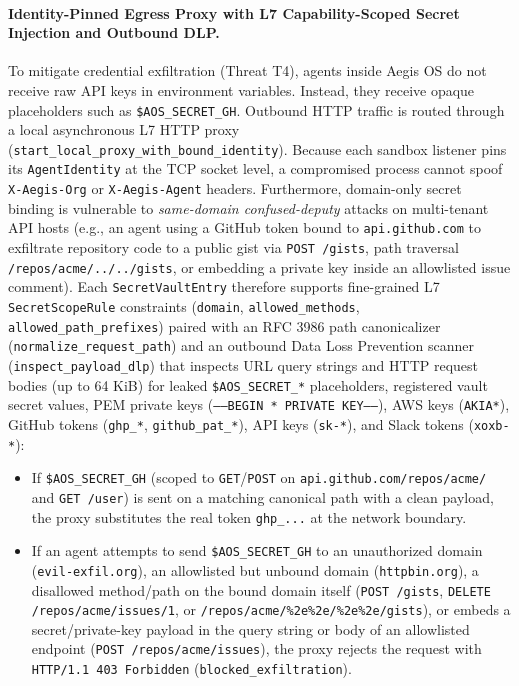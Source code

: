 \documentclass[10pt,twocolumn]{article}
\begin{document}
\paragraph{Identity-Pinned Egress Proxy with L7 Capability-Scoped Secret Injection and Outbound DLP.} To mitigate credential exfiltration (Threat T4), agents inside Aegis OS do not receive raw API keys in environment variables. Instead, they receive opaque placeholders such as \texttt{\$AOS\_SECRET\_GH}. Outbound HTTP traffic is routed through a local asynchronous L7 HTTP proxy (\texttt{start\_local\_proxy\_with\_bound\_identity}). Because each sandbox listener pins its \texttt{AgentIdentity} at the TCP socket level, a compromised process cannot spoof \texttt{X-Aegis-Org} or \texttt{X-Aegis-Agent} headers. Furthermore, domain-only secret binding is vulnerable to \emph{same-domain confused-deputy} attacks on multi-tenant API hosts (e.g., an agent using a GitHub token bound to \texttt{api.github.com} to exfiltrate repository code to a public gist via \texttt{POST /gists}, path traversal \texttt{/repos/acme/../../gists}, or embedding a private key inside an allowlisted issue comment). Each \texttt{SecretVaultEntry} therefore supports fine-grained L7 \texttt{SecretScopeRule} constraints (\texttt{domain}, \texttt{allowed\_methods}, \texttt{allowed\_path\_prefixes}) paired with an RFC 3986 path canonicalizer (\texttt{normalize\_request\_path}) and an outbound Data Loss Prevention scanner (\texttt{inspect\_payload\_dlp}) that inspects URL query strings and HTTP request bodies (up to 64 KiB) for leaked \texttt{\$AOS\_SECRET\_*} placeholders, registered vault secret values, PEM private keys (\texttt{-----BEGIN * PRIVATE KEY-----}), AWS keys (\texttt{AKIA*}), GitHub tokens (\texttt{ghp\_*}, \texttt{github\_pat\_*}), API keys (\texttt{sk-*}), and Slack tokens (\texttt{xoxb-*}):
\begin{itemize}
    \item If \texttt{\$AOS\_SECRET\_GH} (scoped to \texttt{GET}/\texttt{POST} on \texttt{api.github.com/repos/acme/} and \texttt{GET /user}) is sent on a matching canonical path with a clean payload, the proxy substitutes the real token \texttt{ghp\_...} at the network boundary.
    \item If an agent attempts to send \texttt{\$AOS\_SECRET\_GH} to an unauthorized domain (\texttt{evil-exfil.org}), an allowlisted but unbound domain (\texttt{httpbin.org}), a disallowed method/path on the bound domain itself (\texttt{POST /gists}, \texttt{DELETE /repos/acme/issues/1}, or \texttt{/repos/acme/\%2e\%2e/\%2e\%2e/gists}), or embeds a secret/private-key payload in the query string or body of an allowlisted endpoint (\texttt{POST /repos/acme/issues}), the proxy rejects the request with \texttt{HTTP/1.1 403 Forbidden} (\texttt{blocked\_exfiltration}).
\end{itemize}
\end{document}
